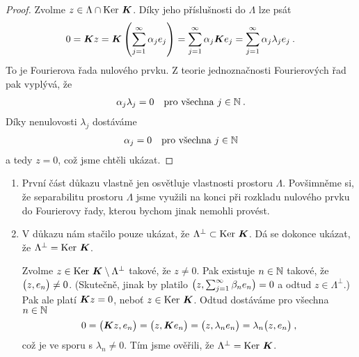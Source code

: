 \begin{proof}
Zvolme $z \in \Lambda \cap \operatorname{Ker}\, \boldsymbol{K}$. Díky jeho příslušnosti do $\Lambda$ lze psát \begin{align*}
    0 = \boldsymbol{K} z = \boldsymbol{K} \left( \sum_{j=1}^\infty \alpha_j e_j \right) =  \sum_{j=1}^\infty \alpha_j \boldsymbol{K} e_j =  \sum_{j=1}^\infty \alpha_j \lambda_j e_j \:.
\end{align*}
To je Fourierova řada nulového prvku. Z teorie jednoznačnosti Fourierových řad pak vyplývá, že \begin{align*}
    \alpha_j \lambda_j =0 \quad \text{pro všechna } j \in \mathbb{N} \:.
\end{align*}
Díky nenulovosti $\lambda_j$ dostáváme \begin{align}
    \alpha_j =0 \quad \text{pro všechna } j \in \mathbb{N}
\end{align}
a tedy $z = 0$, což jsme chtěli ukázat.
\end{proof}

\begin{remark}
\begin{enumerate}
    \item První část důkazu vlastně jen osvětluje vlastnosti prostoru $\Lambda$. Povšimněme si, že separabilitu prostoru $\Lambda$ jsme využili na konci při rozkladu nulového prvku do Fourierovy řady, kterou bychom jinak nemohli provést.
    \item V důkazu nám stačilo pouze ukázat, že $\Lambda^\bot \subset \operatorname{Ker}\, \boldsymbol{K}$. Dá se dokonce ukázat, že $\Lambda^\bot = \operatorname{Ker}\, \boldsymbol{K}$.
    
    Zvolme $z \in \operatorname{Ker}\, \boldsymbol{K} \setminus \Lambda^\bot $ takové, že $z \neq 0$. Pak existuje $n \in \mathbb{N}$ takové, že $\big( z, e_n \big) \neq 0$. (Skutečně, jinak by platilo $\big( z, \sum_{j=1}^\infty \beta_n e_n \big) =0 $ a odtud $z \in \Lambda^\bot$.) Pak ale platí $\boldsymbol{K} z =0$, neboť $z \in \operatorname{Ker}\, \boldsymbol{K}$. Odtud dostáváme pro všechna $n \in \mathbb{N}$ \begin{align*}
        0 = \big( \boldsymbol{K} z, e_n \big) = \big( z, \boldsymbol{K} e_n \big) = \big( z, \lambda_n e_n \big) = \lambda_n \big( z, e_n \big) \:,
    \end{align*}
    což je ve sporu s $\lambda_n \neq 0$. Tím jsme ověřili, že $\Lambda^\bot = \operatorname{Ker}\, \boldsymbol{K}$.
\end{enumerate}
\end{remark}

